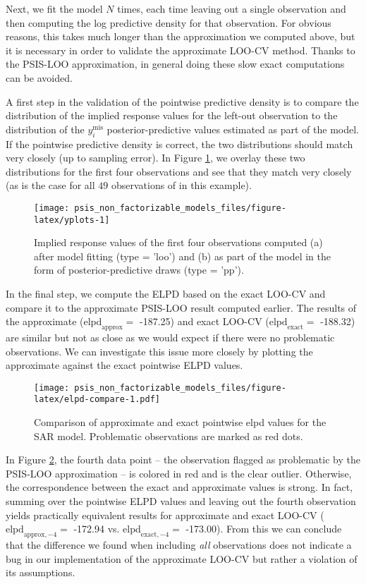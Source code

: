 \documentclass[english,,doc,floatsintext]{apa6}
\theoremstyle{definition}
\theoremstyle{definition}
\theoremstyle{definition}
\theoremstyle{remark}
\begin{document}
Next, we fit the model \(N\) times, each time leaving out a single
observation and then computing the log predictive density for that
observation. For obvious reasons, this takes much longer than the
approximation we computed above, but it is necessary in order to
validate the approximate LOO-CV method. Thanks to the PSIS-LOO
approximation, in general doing these slow exact computations can be
avoided.

A first step in the validation of the pointwise predictive density is to
compare the distribution of the implied response values for the left-out
observation to the distribution of the \(y_i^{\mathrm{mis}}\)
posterior-predictive values estimated as part of the model. If the
pointwise predictive density is correct, the two distributions should
match very closely (up to sampling error). In Figure \ref{fig:yplots},
we overlay these two distributions for the first four observations and
see that they match very closely (as is the case for all \(49\)
observations of in this example).

\begin{figure}
\texttt{[image: psis\_non\_factorizable\_models\_files/figure-latex/yplots-1]} \caption{Implied response values of the first four observations computed (a) after model fitting (type = 'loo') and (b) as part of the model in the form of posterior-predictive draws (type = 'pp').}\label{fig:yplots}
\end{figure}

In the final step, we compute the ELPD based on the exact LOO-CV and
compare it to the approximate PSIS-LOO result computed earlier. The
results of the approximate (\(\text{elpd}_{\text{approx}} =\) -187.25)
and exact LOO-CV (\(\text{elpd}_{\text{exact}} =\) -188.32) are similar
but not as close as we would expect if there were no problematic
observations. We can investigate this issue more closely by plotting the
approximate against the exact pointwise ELPD values.

\begin{figure}
\centering
\texttt{[image: psis\_non\_factorizable\_models\_files/figure-latex/elpd-compare-1.pdf]}
\caption{\label{fig:elpd-compare}Comparison of approximate and exact
pointwise elpd values for the SAR model. Problematic observations are
marked as red dots.}
\end{figure}

In Figure \ref{fig:elpd-compare}, the fourth data point -- the
observation flagged as problematic by the PSIS-LOO approximation -- is
colored in red and is the clear outlier. Otherwise, the correspondence
between the exact and approximate values is strong. In fact, summing
over the pointwise ELPD values and leaving out the fourth observation
yields practically equivalent results for approximate and exact LOO-CV
(\(\text{elpd}_{\text{approx},-4} =\) -172.94 vs.
\(\text{elpd}_{\text{exact},-4} =\) -173.00). From this we can conclude
that the difference we found when including \emph{all} observations does
not indicate a bug in our implementation of the approximate LOO-CV but
rather a violation of its assumptions.
\end{document}
